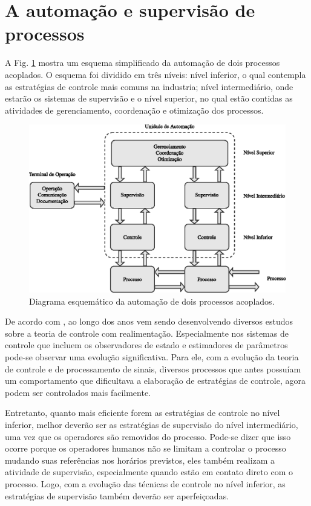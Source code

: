 \section{A automação e supervisão de processos}
A Fig. \ref{fig:esquema_automacao} mostra um esquema simplificado da automação
de dois processos acoplados. O esquema foi dividido em três níveis: nível
inferior, o qual contempla as estratégias de controle mais comuns na industria;
nível intermediário, onde estarão os sistemas de supervisão e o nível superior,
no qual estão contidas as atividades de gerenciamento, coordenação e otimização
dos processos.

\begin{figure}[!htb]
\centering
    \includegraphics{imgs/introducao/eps/esquema_automacao}
    \caption{Diagrama esquemático da automação de dois processos acoplados.}
    \label{fig:esquema_automacao}
\end{figure}

De acordo com , ao longo dos anos vem sendo
desenvolvendo diversos estudos sobre a teoria de controle com realimentação.
Especialmente nos sistemas de controle que incluem os observadores de estado e
estimadores de parâmetros pode-se observar uma evolução significativa. Para ele,
com a evolução da teoria de controle e de processamento de sinais, diversos
processos que antes possuíam um comportamento que dificultava a elaboração de
estratégias de controle, agora podem ser controlados mais facilmente.

Entretanto, quanto mais eficiente forem as estratégias de controle no nível
inferior, melhor deverão ser as estratégias de supervisão do nível
intermediário, uma vez que os operadores são removidos do processo. Pode-se
dizer que isso ocorre porque os operadores humanos não se limitam a controlar o
processo mudando suas referências nos horários previstos, eles também realizam
a atividade de supervisão, especialmente quando estão em contato direto com o
processo. Logo, com a evolução das técnicas de controle no nível inferior, as
estratégias de supervisão também deverão ser aperfeiçoadas.

